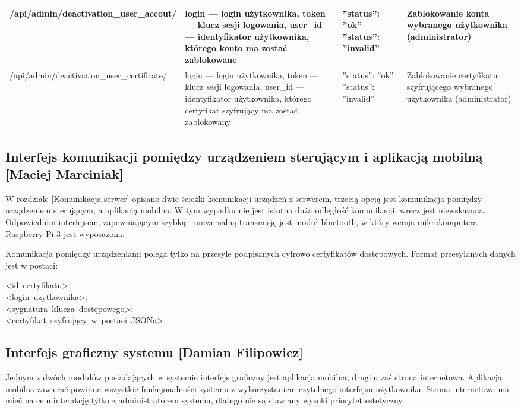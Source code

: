 \begin{landscape}
\begin{longtable}[!ht]{|m{5cm}|m{5cm}|m{4.7cm}|m{4cm}|}
		/api/admin/deactivation\-\_user\_accout/ & login --- login użytkownika, \newline token --- klucz sesji logowania, \newline user\_id --- identyfikator użytkownika, którego konto ma zostać zablokowane & ''status'': ''ok'' \tablinia ''status'': ''invalid'' & Zablokowanie konta wybranego użytkownika (administrator) \\ \hline
		/api/admin/deactivation\-\_user\_certificate/ & login --- login użytkownika, \newline token --- klucz sesji logowania, \newline user\_id --- identyfikator użytkownika, którego certyfikat szyfrujący ma zostać zablokowany & ''status'': ''ok'' \tablinia ''status'': ''invalid'' & Zablokowanie certyfikatu szyfrującego wybranego użytkownika (administrator) \\ \hline
	\end{longtable}\cite{programowanie_aplikacji_webowych}
\end{landscape}
\newpage
\subsection[Interfejs komunikacji pomiędzy urządzeniem sterującym i aplikacją mobilną]{Interfejs komunikacji pomiędzy urządzeniem \newline sterującym i aplikacją mobilną [Maciej Marciniak]}
W rozdziale \ref{Komunikacja serwer} opisano dwie ścieżki komunikacji urządzeń z serwerem, trzecią opcją jest komunikacja pomiędzy urządzeniem sterującym, a aplikacją mobilną. W tym wypadku nie jest istotna duża odległość komunikacji, wręcz jest niewskazana. Odpowiednim interfejsem, zapewniającym szybką i uniwersalną transmisję jest moduł bluetooth, w który wersja mikrokomputera Raspberry Pi 3 jest wyposażona. 

Komunikacja pomiędzy urządzeniami polega tylko na przesyle podpisanych cyfrowo certyfikatów dostępowych. Format przesyłanych danych jest w postaci: \\
\begin{minipage}[t]{\textwidth}
	<id~certyfikatu>;\\<login~użytkownika>;\\<sygnatura~klucza~dostępowego>;\\<certyfikat~szyfrujący~w~postaci~JSONa>
\end{minipage} 

\newpage
\subsection[Interfejs graficzny systemu]{Interfejs graficzny systemu [Damian Filipowicz]}\label{sec:Projekt interfejsu graficznego}
Jednym z dwóch modułów posiadających w systemie interfejs graficzny jest aplikacja mobilna, drugim zaś strona internetowa. Aplikacja mobilna zawierać powinna wszystkie funkcjonalności systemu z wykorzystaniem czytelnego interfejsu użytkownika. Strona internetowa  ma mieć na celu interakcję tylko z administratorem systemu, dlatego nie są stawiany wysoki priorytet estetyczny. 
